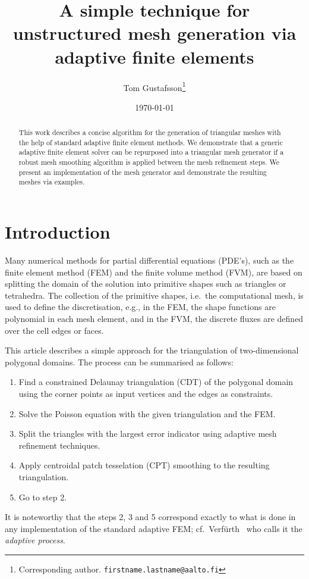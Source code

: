 \documentclass[11pt]{article}
\author{Tom Gustafsson\footnote{Corresponding author. \texttt{firstname.lastname@aalto.fi}}}
\date{\today}
\title{A simple technique for unstructured mesh generation via adaptive finite elements}
\begin{document}
\newcommand*\DNA{\textsc{dna}}

\newcommand*\Let[2]{\State #1 $\gets$ #2}
\algrenewcommand{}
\algrenewcommand{}

\maketitle

\begin{abstract}
  This work describes a concise algorithm for the generation of triangular
  meshes with the help of standard adaptive finite element methods.  We
  demonstrate that a generic adaptive finite element solver can be repurposed
  into a triangular mesh generator if a robust mesh smoothing algorithm is
  applied between the mesh refinement steps.  We present an implementation of
  the mesh generator and demonstrate the resulting meshes via examples.
\end{abstract}

\section{Introduction}
\label{sec:orge4667b0}

Many numerical methods for partial differential equations (PDE's), such as the
finite element method (FEM) and the finite volume method (FVM), are based on
splitting the domain of the solution into primitive shapes such as triangles or
tetrahedra.  The collection of the primitive shapes, i.e.~the computational
mesh, is used to define the discretisation, e.g., in the FEM, the shape
functions are polynomial in each mesh element, and in the FVM, the discrete
fluxes are defined over the cell edges or faces.

This article describes a simple approach for the triangulation of
two-dimensional polygonal domains.  The process can be summarised as follows:
\begin{enumerate}
\item Find a constrained Delaunay triangulation (CDT) of the polygonal domain
      using the corner points as input vertices and the edges
      as constraints.
\item Solve the Poisson equation with the given triangulation
      and the FEM.
\item Split
      the triangles with the largest error indicator
      using adaptive mesh refinement techniques.
\item Apply centroidal patch tesselation (CPT) smoothing to the resulting
  triangulation.
\item Go to step 2.
\end{enumerate}
It is noteworthy that the steps 2, 3 and 5 correspond exactly to what is done in
any implementation of the standard adaptive FEM;
cf.~Verf\"{u}rth~\cite{Verf_rth_2013} who calls it the \emph{adaptive process}.
\end{document}
